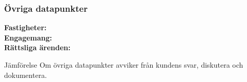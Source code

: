 \documentclass[10pt]{beamer}
\begin{document}
\begin{frame}[label=ovrigt]
  \frametitle{Övriga datapunkter}
  \small
  \textbf{Fastigheter:} \underline{\hspace{8cm}} \\
  \textbf{Engagemang:} \underline{\hspace{8cm}} \\
  \textbf{Rättsliga ärenden:} \underline{\hspace{8cm}} \\
  \vspace{0.5cm}
  \begin{block}{Jämförelse}
    Om övriga datapunkter avviker från kundens svar, diskutera och dokumentera.
  \end{block}
  \vspace{0.8cm}
  \begin{flushright}
    \hyperlink{nextslide}{}
  \end{flushright}
\end{frame}

%
%
\end{document}
